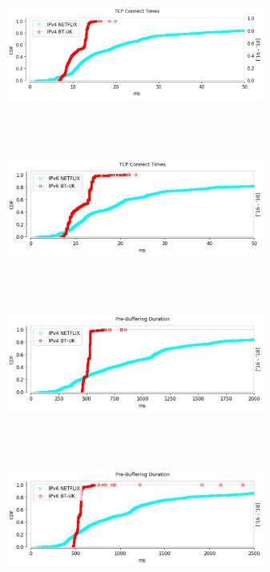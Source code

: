 \begin{figure}
	\centering
	\begin{minipage}{0.5\textwidth}
		\centering
		\includegraphics[keepaspectratio, height=5cm, width=8.5cm]{figures/cache/btuk/netflix-syn-time-separate-btuk-v4.pdf}
	\end{minipage}
	\begin{minipage}{0.5\textwidth}
		\centering
		\includegraphics[keepaspectratio, height=5cm, width=8.5cm]{figures/cache/btuk/netflix-syn-time-separate-btuk-v6.pdf}
	\end{minipage}
	\begin{minipage}{0.5\textwidth}
		\centering
		\includegraphics[keepaspectratio, height=5cm, width=8.5cm]{figures/cache/btuk/netflix-prebuffering-duration-separate-btuk-v4.pdf}
	\end{minipage}
	\begin{minipage}{0.5\textwidth}
		\centering
		\includegraphics[keepaspectratio, height=5cm, width=8.5cm]{figures/cache/btuk/netflix-prebuffering-duration-separate-btuk-v6.pdf}

\end{minipage}
\end{figure}
